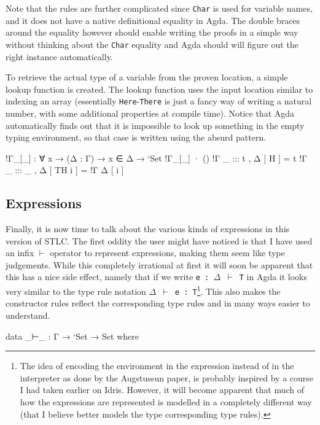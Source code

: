 \documentclass{article}
\begin{document}
Note that the rules are further complicated since \texttt{Char} is used for variable names, and it does not
have a native definitional equality in Agda. The double braces around the equality however should enable writing
the proofs in a simple way without thinking about the \texttt{Char} equality and Agda should will figure out the right instance automatically.

To retrieve the actual type of a variable from the proven location, a simple lookup function is created. The lookup
function uses the input location similar to indexing an array (essentially \texttt{Here}-\texttt{There} is just a fancy
way of writing a natural number, with some additional properties at compile time). Notice that Agda automatically finds
out that it is impossible to look up something in the empty typing environment, so that case is written using the absurd pattern.

\begin{code}
  !Γ_[_] : ∀ {x} → (Δ : Γ) → x ∈ Δ → `Set
  !Γ_[_] · ()
  !Γ _ ::: t , Δ [ H ]     = t
  !Γ _ ::: _ , Δ [ TH i ]  = !Γ Δ [ i ]
\end{code}

\subsection{Expressions}
\label{sub:Expressions}
Finally, it is now time to talk about the various kinds of expressions in this version of STLC. The first oddity the user
might have noticed is that I have used an infix \texttt{$\vdash$} operator to represent expressions, making them seem
like type judgements. While this completely irrational at first it will soon be apparent that this has a nice side effect,
namely that if we write \texttt{e : $\Delta$ $\vdash$ T} in Agda it looks very similar to the type rule notation
\texttt{$\Delta$ $\vdash$ e : T}\footnote{The idea of encoding the environment in the expression instead of in the interpreter as done by the Augstussun paper\cite{Augustsson99anexercise}, is probably inspired by a course I had taken earlier on Idris\cite{brady2013course}. However, it will become apparent that much of how the expressions are represented is modelled in a completely different way (that I believe better models the type corresponding type rules).}. This also makes the constructor rules reflect the corresponding type rules and in many
ways easier to understand.

\begin{code}
  data _⊢_ : Γ → `Set → Set where
\end{code}
\end{document}
